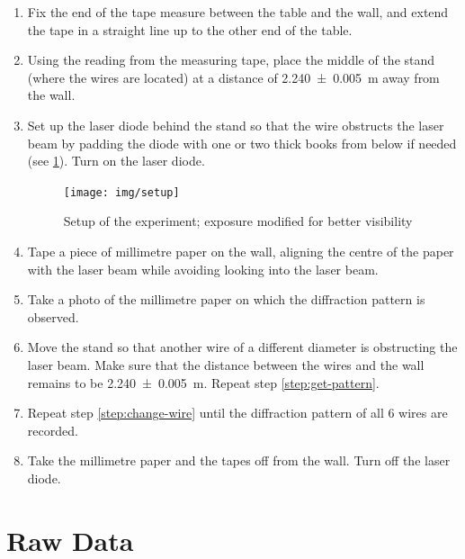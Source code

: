 \documentclass[a4paper, 12pt]{article}
\begin{document}
\begin{enumerate}
\itemsep 0.2em
    \item Fix the end of the tape measure between the table and the wall, and extend the tape in a straight line up to the other end of the table.
    \item Using the reading from the measuring tape, place the middle of the stand (where the wires are located) at a distance of \SI{2.240+-0.005}{\m} away from the wall. \label{step:place-stand}
    \item Set up the laser diode behind the stand so that the wire obstructs the laser beam by padding the diode with one or two thick books from below if needed (see \cref{fig:setup}). Turn on the laser diode. \label{step:place-laser}
\begin{figure}[H]
    \centering
    \texttt{[image: img/setup]}
    \caption{Setup of the experiment; exposure modified for better visibility}
    \label{fig:setup}
\end{figure}
    \item Tape a piece of millimetre paper on the wall, aligning the centre of the paper with the laser beam while avoiding looking into the laser beam.
    \item Take a photo of the millimetre paper on which the diffraction pattern is observed. \label{step:get-pattern}
    \item Move the stand so that another wire of a different diameter is obstructing the laser beam. Make sure that the distance between the wires and the wall remains to be \SI{2.240+-0.005}{\m}. Repeat step \ref{step:get-pattern}. \label{step:change-wire}
    \item Repeat step \ref{step:change-wire} until the diffraction pattern of all 6 wires are recorded. \label{step:iterate-wire}
    \item Take the millimetre paper and the tapes off from the wall. Turn off the laser diode. \label{step:clean-up}
\end{enumerate}

\section{Raw Data}
\end{document}
